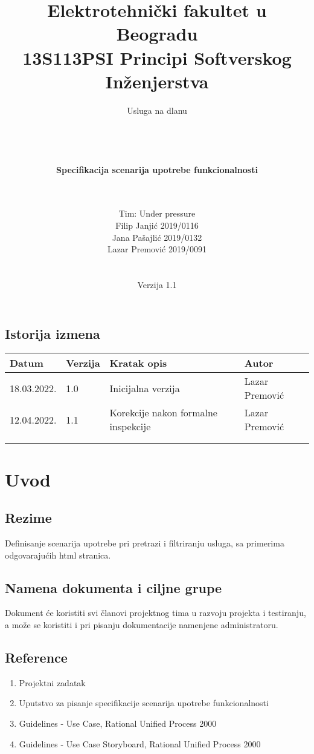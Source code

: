 \documentclass[a4paper,12pt]{report}
\title{\Large Elektrotehnički fakultet u Beogradu \\ 13S113PSI Principi Softverskog Inženjerstva}
\author{\Huge Usluga na dlanu\\ \ \\ \ \\ \ \\ \ \\
	\Large \textbf{Specifikacija scenarija upotrebe funkcionalnosti}\\\Large \textbf{\genitivfunkcionalnosti} \\ \ \\}
\date{\Large   Tim: Under pressure \\ Filip Janjić 2019/0116 \\ Jana Pašajlić 2019/0132 \\ Lazar Premović 2019/0091  \\ \  \\ \  \\
	\large Verzija 1.1}
\newcommand{\dativfunkcionalnosti }{pretrazi i filtriranju usluga}
\newcommand{\inicijalniautor}{Lazar Premović}
\newcommand{\inicijalnidatum}{18.03.2022.}
\begin{document}
	
	\maketitle
	
	\begin{center}
		\section*{Istorija izmena}
			\begin{tabular}{ |l|l|l|l| }
				\hline
				\textbf{Datum} & \textbf{Verzija} & \textbf{Kratak opis} & \textbf{Autor} \\ 
				\hline
				\inicijalnidatum & 1.0  & Inicijalna verzija & \inicijalniautor \\
				\hline
				12.04.2022. & 1.1 & Korekcije nakon formalne inspekcije & \inicijalniautor \\
				\hline
				&  &  &  \\
				\hline
				&  &  &  \\
				\hline
			\end{tabular}
	\end{center}
	
	\newpage
	
	\tableofcontents
	
	\newpage
	
	\section{Uvod}
		\subsection{Rezime}
			Definisanje scenarija upotrebe pri \dativfunkcionalnosti, sa primerima odgovarajućih html stranica.
		\subsection{Namena dokumenta i ciljne grupe}
			Dokument će koristiti svi članovi projektnog tima u razvoju projekta i testiranju, a može se koristiti i pri pisanju dokumentacije namenjene administratoru.
		\subsection{Reference}
			\begin{enumerate}
				\item Projektni zadatak
				\item Uputstvo za pisanje specifikacije scenarija upotrebe funkcionalnosti
				\item Guidelines - Use Case, Rational Unified Process 2000
				\item Guidelines - Use Case Storyboard, Rational Unified Process 2000
			\end{enumerate}
\end{document}
